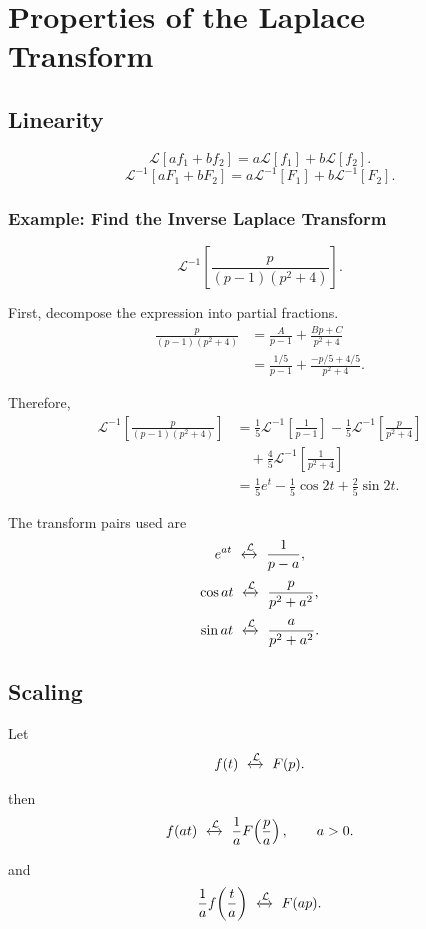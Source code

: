 \documentclass[11pt,a4paper]{article}
\theoremstyle{definition}
\theoremstyle{plain}
\begin{document}
\section{Properties of the Laplace Transform}

\subsection{Linearity}
\[
\mathcal L[af_1+bf_2]
=a\mathcal L[f_1]+b\mathcal L[f_2].
\]
\[
\mathcal L^{-1}[aF_1+bF_2]
=a\mathcal L^{-1}[F_1]+b\mathcal L^{-1}[F_2].
\]

\subsubsection*{Example: Find the Inverse Laplace Transform}
\[
\mathcal L^{-1}\!\left[
\frac{p}{(p-1)(p^2+4)}
\right].
\]

First, decompose the expression into partial fractions.
\[
\begin{aligned}
\frac{p}{(p-1)(p^2+4)}
&=\frac{A}{p-1}+\frac{Bp+C}{p^2+4}\\
&=\frac{1/5}{p-1}
+\frac{-p/5+4/5}{p^2+4}.
\end{aligned}
\]

Therefore,
\[
\begin{aligned}
\mathcal L^{-1}\!\left[
\frac{p}{(p-1)(p^2+4)}
\right]
&=\frac15\mathcal L^{-1}\!\left[\frac1{p-1}\right]
-\frac15\mathcal L^{-1}\!\left[\frac{p}{p^2+4}\right]\\
&\quad+\frac45\mathcal L^{-1}\!\left[\frac1{p^2+4}\right]\\
&=\frac15e^t-\frac15\cos2t+\frac25\sin2t.
\end{aligned}
\]

The transform pairs used are
\[
e^{at}\ \xleftrightarrow{\mathcal L}\ \frac1{p-a},
\]
\[
\cos at\ \xleftrightarrow{\mathcal L}\ \frac{p}{p^2+a^2},
\]
\[
\sin at\ \xleftrightarrow{\mathcal L}\ \frac{a}{p^2+a^2}.
\]

\subsection{Scaling}

Let
\[
f(t)\ \xleftrightarrow{\mathcal L}\ F(p).
\]

then
\[
f(at)\ \xleftrightarrow{\mathcal L}\
\frac1aF\!\left(\frac pa\right),
\qquad a>0.
\]

and
\[
\frac1a f\!\left(\frac ta\right)
\ \xleftrightarrow{\mathcal L}\
F(ap).
\]
\end{document}
